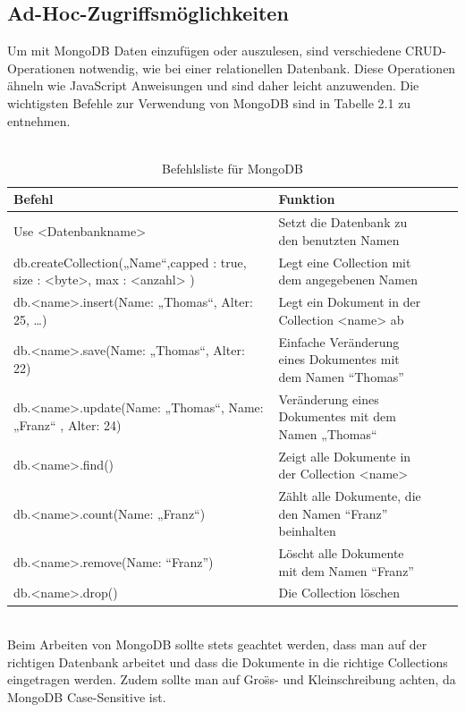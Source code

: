 \subsection{Ad-Hoc-Zugriffsm\"oglichkeiten}
Um mit MongoDB Daten einzuf\"ugen oder auszulesen, sind verschiedene CRUD-Operationen notwendig, wie bei einer relationellen Datenbank. Diese Operationen \"ahneln wie JavaScript Anweisungen und sind daher leicht anzuwenden. Die wichtigsten Befehle zur Verwendung von MongoDB sind in Tabelle 2.1 zu entnehmen.\cite{mongo01}
\\
\\
\begin{table}[h]
\centering
\begin{tabular}{|p{7cm}|p{7cm}|c|c|}
\hline 
Befehl & Funktion \\ 
\hline 
Use <Datenbankname> & Setzt die Datenbank zu den benutzten Namen \\ 
\hline 
db.createCollection(„Name“,{capped : true, size : <byte>, max : <anzahl> }) & Legt eine Collection mit dem angegebenen Namen \\ 
\hline 
db.<name>.insert({Name: „Thomas“, Alter: 25, …})  & Legt ein Dokument in der Collection <name> ab \\ 
\hline 
db.<name>.save({Name: „Thomas“, Alter: 22}) & Einfache Veränderung eines Dokumentes mit dem Namen “Thomas” \\ 
\hline 
db.<name>.update({Name: „Thomas“}, {Name: „Franz“ , Alter: 24}) & Veränderung eines Dokumentes mit dem Namen „Thomas“ \\ 
\hline 
db.<name>.find() & Zeigt alle Dokumente in der Collection <name> \\ 
\hline 
db.<name>.count({Name: „Franz“}) & Zählt alle Dokumente, die den Namen “Franz” beinhalten \\ 
\hline 
db.<name>.remove({Name: “Franz”}) & Löscht alle Dokumente mit dem Namen “Franz” \\ 
\hline 
db.<name>.drop() & Die Collection löschen \\ 
\hline 
\end{tabular}
\caption{Befehlsliste für MongoDB}
\end{table} 
\\
Beim Arbeiten von MongoDB sollte stets geachtet werden, dass man auf der richtigen Datenbank arbeitet und dass die Dokumente in die richtige Collections eingetragen werden. Zudem sollte man auf Gro\"ss-  und Kleinschreibung achten, da MongoDB Case-Sensitive ist.